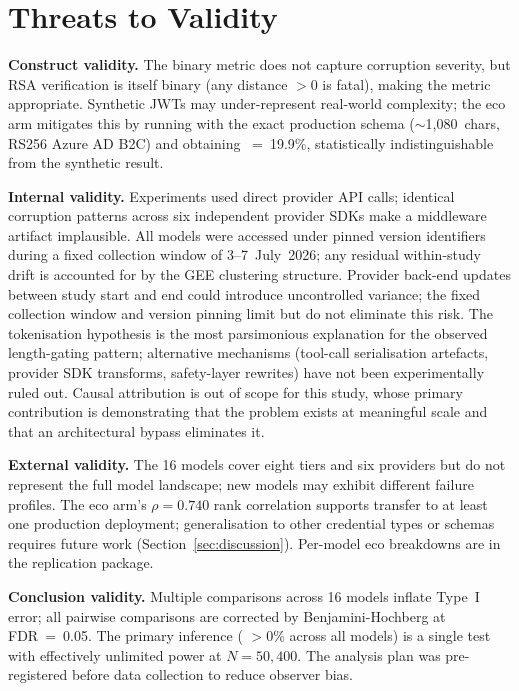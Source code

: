 %

\section{Threats to Validity}\label{sec:threats}

\textbf{Construct validity.}
The binary \DFR{} metric does not capture corruption severity, but RSA
verification is itself binary (any distance $>0$ is fatal), making the metric
appropriate. Synthetic JWTs may under-represent real-world complexity; the eco
arm mitigates this by running with the exact production schema
($\sim$1{,}080~chars, RS256 Azure AD B2C) and obtaining
\DFR{}~=~19.9\%, statistically indistinguishable from the synthetic result.

\textbf{Internal validity.}
Experiments used direct provider API calls; identical corruption patterns
across six independent provider SDKs make a middleware artifact implausible.
All models were accessed under pinned version identifiers during a fixed
collection window of 3--7~July~2026; any residual within-study drift is
accounted for by the GEE clustering structure. Provider back-end updates
between study start and end could introduce uncontrolled variance; the fixed
collection window and version pinning limit but do not eliminate this risk.
The tokenisation hypothesis is the most parsimonious explanation for the
observed length-gating pattern; alternative mechanisms (tool-call
serialisation artefacts, provider SDK transforms, safety-layer rewrites)
have not been experimentally ruled out. Causal attribution is out of scope
for this study, whose primary contribution is demonstrating that the problem
exists at meaningful scale and that an architectural bypass eliminates it.

\textbf{External validity.}
The 16 models cover eight tiers and six providers but do not represent
the full model landscape; new models may exhibit different failure profiles.
The eco arm's $\rho\!=\!0.740$ rank correlation supports transfer to at least one
production deployment; generalisation to other credential types or schemas
requires future work (Section~\ref{sec:discussion}).
Per-model eco breakdowns are in the replication package.

\textbf{Conclusion validity.}
Multiple comparisons across 16 models inflate Type~I error; all pairwise
comparisons are corrected by Benjamini-Hochberg at FDR~=~0.05. The primary
inference (\DFR{} $> 0$\% across all models) is a single test with effectively
unlimited power at $N\!=\!50{,}400$. The analysis plan was pre-registered
before data collection to reduce observer bias.
